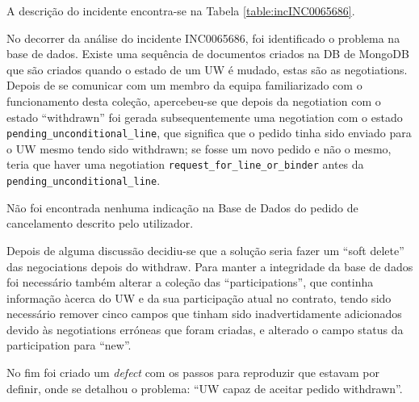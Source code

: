             A descrição do incidente encontra-se na Tabela \ref{table:incINC0065686}.

            No decorrer da análise do incidente INC0065686, foi identificado o problema na base de dados. Existe uma sequência de documentos criados na DB de MongoDB que são criados quando o estado de um UW é mudado, estas são as negotiations. Depois de se comunicar com um membro da equipa familiarizado com o funcionamento desta coleção, apercebeu-se que depois da negotiation com o estado ``withdrawn'' foi gerada subsequentemente uma negotiation com o estado \texttt{pending\_unconditional\_line}, que significa que o pedido tinha sido enviado para o UW mesmo tendo sido withdrawn; se fosse um novo pedido e não o mesmo, teria que haver uma negotiation \texttt{request\_for\_line\_or\_binder} antes da \texttt{pending\_unconditional\_line}.

            Não foi encontrada nenhuma indicação na Base de Dados do pedido de cancelamento descrito pelo utilizador.

            Depois de alguma discussão decidiu-se que a solução seria fazer um ``soft delete'' das negociations depois do withdraw. Para manter a integridade da base de dados foi necessário também alterar a coleção das ``participations'', que continha informação àcerca do UW e da sua participação atual no contrato, tendo sido necessário remover cinco campos que tinham sido inadvertidamente adicionados devido às negotiations erróneas que foram criadas, e alterado o campo status da participation para ``new''.
            
            No fim foi criado um \textit{defect} com os passos para reproduzir que estavam por definir, onde se detalhou o problema: ``UW capaz de aceitar pedido withdrawn''.


